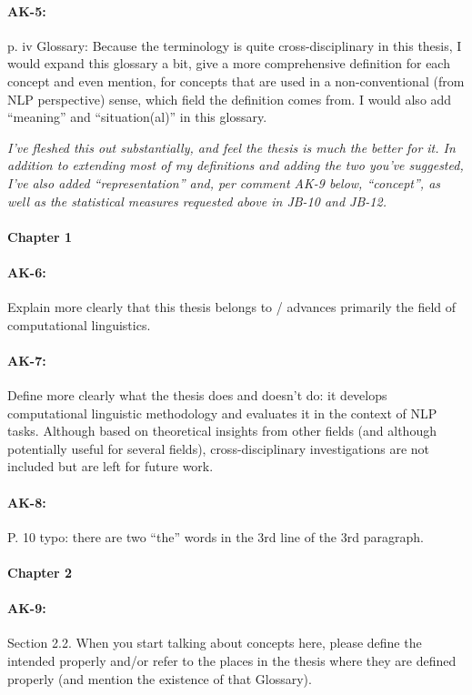 \documentclass[11pt,a4paper]{article}
\newcommand{\res}[1]{\vspace{0.25cm} \begin{adjustwidth}{1cm}{}\emph{#1}\end{adjustwidth}}
\begin{document}
\paragraph{AK-5:} p. iv Glossary: Because the terminology is quite cross-disciplinary in this thesis, I would expand this glossary a bit, give a more comprehensive definition for each concept and even mention, for concepts that are used in a non-conventional (from NLP perspective) sense, which field the definition comes from. I would also add ``meaning'' and ``situation(al)'' in this glossary.

\res{I've fleshed this out substantially, and feel the thesis is much the better for it.  In addition to extending most of my definitions and adding the two you've suggested, I've also added ``representation'' and, per comment AK-9 below, ``concept'', as well as the statistical measures requested above in JB-10 and JB-12.}

\paragraph{Chapter 1}

\paragraph{AK-6:} Explain more clearly that this thesis belongs to / advances primarily the field of computational linguistics.

\paragraph{AK-7:} Define more clearly what the thesis does and doesn’t do: it develops computational linguistic methodology and evaluates it in the context of NLP tasks. Although based on theoretical insights from other fields (and although potentially useful for several fields), cross-disciplinary investigations are not included but are left for future work.

\paragraph{AK-8:} P. 10 typo: there are two “the” words in the 3rd line of the 3rd paragraph.

\paragraph{Chapter 2}

\paragraph{AK-9:} Section 2.2. When you start talking about concepts here, please define the intended properly and/or refer to the places in the thesis where they are defined properly (and mention the existence of that Glossary).
\end{document}

